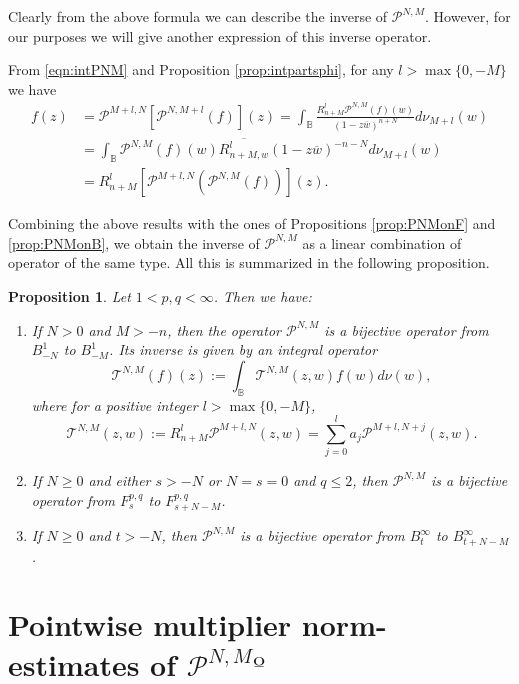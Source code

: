 \documentclass[12pt,twoside,leqno,final]{amsart}
\theoremstyle{plain}
\newtheorem{prop}[thm]{Proposition}
\begin{document}
Clearly from the above formula we can describe the inverse of ${{\mathcal P}}^{N,M}$. However, for our purposes we will give another expression of this inverse operator.

From \eqref{eqn:intPNM} and Proposition \ref{prop:intpartsphi}, for any $l>\max\{0,-M\}$ we have
\begin{align*}
f(z)&={{\mathcal P}}^{M+l,N}\left[{{\mathcal P}}^{N,M+l}(f)\right](z)
=\int_{{\mathbb B}}\frac{R^l_{n+M}{{\mathcal P}}^{N,M}(f)(w)}{(1-z\overline w)^{n+N}}d\nu_{M+l}(w)\\
 &=\int_{{\mathbb B}}{{\mathcal P}}^{N,M}(f)(w)\overline{R^l_{n+M,w}}(1-z\overline w)^{-n-N}d\nu_{M+l}(w)\\
 &=R^{l}_{n+M}\left[{{\mathcal P}}^{M+l,N}\left({{\mathcal P}}^{N,M}(f)\right)\right](z).
\end{align*}

Combining the above results with the ones of Propositions \ref{prop:PNMonF} and  \ref{prop:PNMonB}, 
we obtain the inverse of ${{\mathcal P}}^{N,M}$ as a linear combination of operator of the same type. 
All this is summarized in the following proposition. 

\begin{prop} \label{prop:PNMbij}
Let $1< p,q<\infty$. Then we have:
\begin{enumerate}
		\item If $N>0$ and $M>-n$, then the operator ${{\mathcal P}}^{N,M}$ is a bijective operator from $B^1_{-N}$ to $B^1_{-M}$. Its inverse is given by an integral operator 
	$$
	{{\mathcal T}}^{N,M}(f)(z):=\int_{{\mathbb B}} {{\mathcal T}}^{N,M}(z,w)f(w)d\nu(w),
	$$
	where for a positive integer $l>\max\{0,-M\}$, 
	\begin{equation}\label{eqn:expT}
	 {{\mathcal T}}^{N,M}(z,w):=R^{l}_{n+M}{{\mathcal P}}^{M+l,N}(z,w)=\sum_{j=0}^{l} a_j {{\mathcal P}}^{M+l,N+j}(z,w).
	\end{equation}
	
	\item If $N\ge 0$ and either $s>-N$ or $N=s=0$ and $q\le 2$, then ${{\mathcal P}}^{N,M}$ is a bijective operator from $F^{p,q}_{s}$ to $F^{p,q}_{s+N-M}$.
	
	\item If $N\ge 0$ and $t>-N$, then ${{\mathcal P}}^{N,M}$ is a bijective operator from $B^\infty_t$ to $B^\infty_{t+N-M}$.
\end{enumerate}
\end{prop}

\section{Pointwise multiplier norm-estimates of ${{\mathcal P}}^{N,M}º$ }\label{sec:pointwise}
\end{document}
